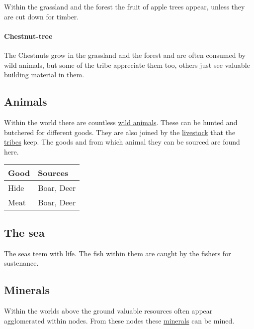 Within the grassland and the forest the fruit of apple trees appear, unless
they are cut down for timber.

\paragraph{Chestnut-tree}

The Chestnuts grow in the grassland and the forest and are often consumed by
wild animals, but some of the tribe appreciate them too, others just see
valuable building material in them.

\subsection{Animals}\label{ch:Goods:Nature:Animals}

Within the world there are countless
\hyperref[ch:World:Inhabitants:Animals]{wild animals}. These can be hunted and
butchered for different goods. They are also joined by the
\hyperref[ch:World:Inhabitants:Livestock]{livestock} that the
\hyperref[ch:Tribes]{tribes} keep. The goods and from which animal they can be
sourced are found here.

\begin{longtable}{ll}
	\toprule
	Good       & Sources                \\
	\midrule
	\Gls{Hide} & \Gls{Boar}, \gls{Deer} \\
	\Gls{Meat} & \Gls{Boar}, \gls{Deer} \\
	\bottomrule
\end{longtable}

\subsection{The sea}\label{ch:Goods:Nature:Sea}

The seas teem with life. The fish within them are caught by the fishers for
sustenance.

\subsection{Minerals}\label{ch:Goods:Nature:Minerals}

Within the worlds above the ground valuable resources often appear agglomerated
within nodes. From these nodes these \hyperref[ch:World:Minerals]{minerals} can
be mined.

\paragraph{}

